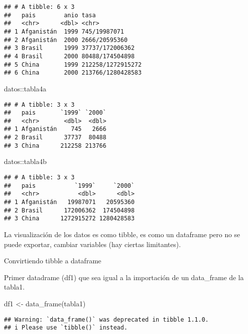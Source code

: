 \documentclass[
]{article}
\newenvironment{Shaded}{\begin{snugshade}}{\end{snugshade}}
\newcommand{\FunctionTok}[1]{\textcolor[rgb]{0.00,0.00,0.00}{#1}}
\newcommand{\NormalTok}[1]{#1}
\newcommand{\OtherTok}[1]{\textcolor[rgb]{0.56,0.35,0.01}{#1}}
\newcommand{\SpecialCharTok}[1]{\textcolor[rgb]{0.00,0.00,0.00}{#1}}
\begin{document}
\begin{verbatim}
## # A tibble: 6 x 3
##   pais        anio tasa             
##   <chr>      <dbl> <chr>            
## 1 Afganistán  1999 745/19987071     
## 2 Afganistán  2000 2666/20595360    
## 3 Brasil      1999 37737/172006362  
## 4 Brasil      2000 80488/174504898  
## 5 China       1999 212258/1272915272
## 6 China       2000 213766/1280428583
\end{verbatim}

\begin{Shaded}
\begin{Highlighting}[]
\NormalTok{datos}\SpecialCharTok{::}\NormalTok{tabla4a}
\end{Highlighting}
\end{Shaded}

\begin{verbatim}
## # A tibble: 3 x 3
##   pais       `1999` `2000`
##   <chr>       <dbl>  <dbl>
## 1 Afganistán    745   2666
## 2 Brasil      37737  80488
## 3 China      212258 213766
\end{verbatim}

\begin{Shaded}
\begin{Highlighting}[]
\NormalTok{datos}\SpecialCharTok{::}\NormalTok{tabla4b}
\end{Highlighting}
\end{Shaded}

\begin{verbatim}
## # A tibble: 3 x 3
##   pais           `1999`     `2000`
##   <chr>           <dbl>      <dbl>
## 1 Afganistán   19987071   20595360
## 2 Brasil      172006362  174504898
## 3 China      1272915272 1280428583
\end{verbatim}

La visualización de los datos es como tibble, es como un dataframe pero
no se puede exportar, cambiar variables (hay ciertas limitantes).

Convirtiendo tibble a dataframe

Primer datadrame (df1) que sea igual a la importación de un data\_frame
de la tabla1.

\begin{Shaded}
\begin{Highlighting}[]
\NormalTok{df1 }\OtherTok{\textless{}{-}} \FunctionTok{data\_frame}\NormalTok{(tabla1)}
\end{Highlighting}
\end{Shaded}

\begin{verbatim}
## Warning: `data_frame()` was deprecated in tibble 1.1.0.
## i Please use `tibble()` instead.
\end{verbatim}
\end{document}
